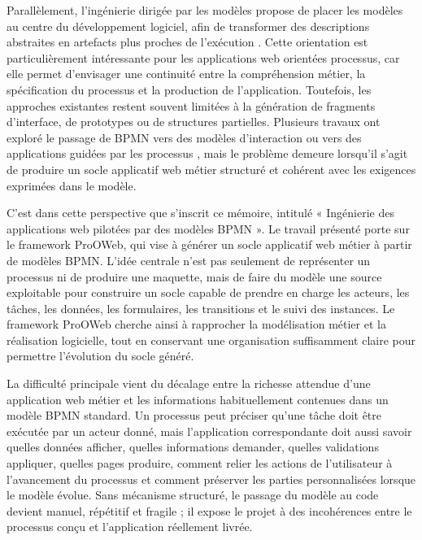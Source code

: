 Parallèlement, l'ingénierie dirigée par les modèles propose de placer les modèles au centre du développement logiciel, afin de transformer des descriptions abstraites en artefacts plus proches de l'exécution \cite{omg2014mda,jezequel2012}. Cette orientation est particulièrement intéressante pour les applications web orientées processus, car elle permet d'envisager une continuité entre la compréhension métier, la spécification du processus et la production de l'application. Toutefois, les approches existantes restent souvent limitées à la génération de fragments d'interface, de prototypes ou de structures partielles. Plusieurs travaux ont exploré le passage de BPMN vers des modèles d'interaction ou vers des applications guidées par les processus \cite{diaz2018,sajji2022,sajji2023,drave2022}, mais le problème demeure lorsqu'il s'agit de produire un socle applicatif web métier structuré et cohérent avec les exigences exprimées dans le modèle.

C'est dans cette perspective que s'inscrit ce mémoire, intitulé « Ingénierie des applications web pilotées par des modèles BPMN ». Le travail présenté porte sur le framework ProOWeb, qui vise à générer un socle applicatif web métier à partir de modèles BPMN. L'idée centrale n'est pas seulement de représenter un processus ni de produire une maquette, mais de faire du modèle une source exploitable pour construire un socle capable de prendre en charge les acteurs, les tâches, les données, les formulaires, les transitions et le suivi des instances. Le framework ProOWeb cherche ainsi à rapprocher la modélisation métier et la réalisation logicielle, tout en conservant une organisation suffisamment claire pour permettre l'évolution du socle généré.

La difficulté principale vient du décalage entre la richesse attendue d'une application web métier et les informations habituellement contenues dans un modèle BPMN standard. Un processus peut préciser qu'une tâche doit être exécutée par un acteur donné, mais l'application correspondante doit aussi savoir quelles données afficher, quelles informations demander, quelles validations appliquer, quelles pages produire, comment relier les actions de l'utilisateur à l'avancement du processus et comment préserver les parties personnalisées lorsque le modèle évolue. Sans mécanisme structuré, le passage du modèle au code devient manuel, répétitif et fragile ; il expose le projet à des incohérences entre le processus conçu et l'application réellement livrée.

